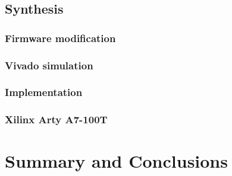 \documentclass[a4paper,8pt]{report}
\begin{document}
\section{Synthesis}
\subsection{Firmware modification}


\subsection{Vivado simulation}                                     

\subsection{Implementation}

\subsection{Xilinx Arty A7-100T}

\chapter{Summary and Conclusions} 




\appendix
\singlespacing

 
%  

\end{document}
